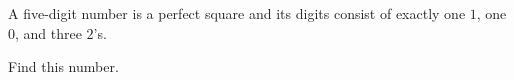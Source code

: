 A five-digit number is a perfect square and its digits consist of exactly one $1$, one $0$, and three $2$'s.



Find this number.

